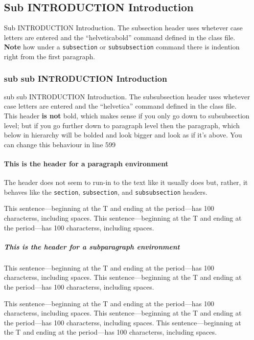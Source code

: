 \documentclass[utf8]{my_class_1_front_vanc}  %
\begin{document}
\subsection{Sub INTRODUCTION Introduction}%

Sub INTRODUCTION Introduction. The subsection header uses whetever case letters are entered and the
``helveticabold'' command defined in the class file. \textbf{Note} how under a {\tt subsection} or
{\tt subsubsection} command there is indention right from the first paragraph.

\subsubsection{sub sub INTRODUCTION Introduction}%

sub sub INTRODUCTION Introduction. The subsubsection header uses whetever case letters are entered
and the ``helvetica'' command defined in the class file. This header \textbf{is not} bold, which
makes sense if you only go down to subsubsection level; but if you go further down to paragraph
level then the paragraph, which below in hierarchy will be bolded and look bigger and look as if
it's above. You can change this behaviour in line 599

\paragraph{This is the header for a paragraph environment} 

The header does not seem to run-in to the text like it usually does but, rather, it behaves like
the {\tt section}, {\tt subsection}, and {\tt subsubsection} headers.

This sentence---beginning at the T and ending at the period---has 100 characterss, including spaces. 
This sentence---beginning at the T and ending at the period---has 100 characterss, including spaces.

\subparagraph{This is the header for a subparagraph environment} 

This sentence---beginning at the T and ending at the period---has 100 characterss, including spaces.
This sentence---beginning at the T and ending at the period---has 100 characterss, including spaces.

This sentence---beginning at the T and ending at the period---has 100 characterss, including spaces.
This sentence---beginning at the T and ending at the period---has 100 characterss, including spaces.
This sentence---beginning at the T and ending at the period---has 100 characterss, including spaces.
\end{document}
